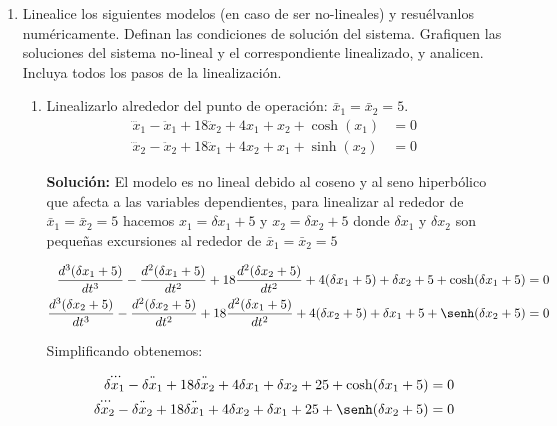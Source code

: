 \documentclass[letterpaper, 12pt]{article}
\begin{document}
\begin{enumerate}
\begin{enumerate}
\end{enumerate}
\item Linealice los siguientes modelos (en caso de ser no-lineales) y resuélvanlos numéricamente. Definan las condiciones de solución del sistema. Grafiquen las soluciones del sistema no-lineal y el
correspondiente linealizado, y analicen. Incluya todos los pasos de la linealización. 
\begin{enumerate}
\item Linealizarlo alrededor del punto de operación: $\bar{x}_1=\bar{x}_2=5$.
\begin{equation}
\begin{split}
    \dddot{x}_1-\ddot{x}_1+18\ddot{x}_2+4x_1+x_2+\cosh(x_1) &= 0 \\ \dddot{x}_2-\ddot{x}_2+18\ddot{x}_1+4x_2+x_1+\sinh(x_2) &= 0
\end{split}
\label{mod1}
\end{equation}

\textbf{Solución:}
El modelo es no lineal debido al coseno y al seno hiperbólico que afecta a las variables dependientes, para linealizar al rededor de $\bar{x}_1=\bar{x}_2=5$ hacemos $x_1=\delta x_1+5$ y $x_2=\delta x_2+5$ donde $\delta x_1$ y $\delta x_2$ son pequeñas excursiones al rededor de $\bar{x}_1=\bar{x}_2=5$

\begin{equation}
\notag
\begin{split}
    \frac{d^3(\delta x_1 + 5)}{dt^3}-\frac{d^2(\delta x_1 + 5)}{dt^2}+18\frac{d^2(\delta x_2 + 5)}{dt^2}+4(\delta x_1 + 5)+\delta x_2 + 5+\cosh(\delta x_1 + 5) &= 0 \\ \frac{d^3(\delta x_2 + 5)}{dt^3}-\frac{d^2(\delta x_2 + 5)}{dt^2}+18\frac{d^2(\delta x_1 + 5)}{dt^2}+4(\delta x_2 + 5)+\delta x_1 + 5+\senh(\delta x_2 + 5) &= 0
\end{split}
\end{equation}

Simplificando obtenemos:

\begin{equation}
\begin{split}
    \dddot{\delta x_1}-\ddot{\delta x_1}+18\ddot{\delta x_2}+4\delta x_1 +\delta x_2 + 25+\cosh(\delta x_1 + 5) &= 0 \\ \dddot{\delta x_2}-\ddot{\delta x_2}+18\ddot{\delta x_1}+4\delta x_2 +\delta x_1 + 25+\senh(\delta x_2 + 5) &= 0 
\end{split}
\label{nuevomod3a}
\end{equation}


\end{enumerate}
\end{enumerate}
\end{document}
